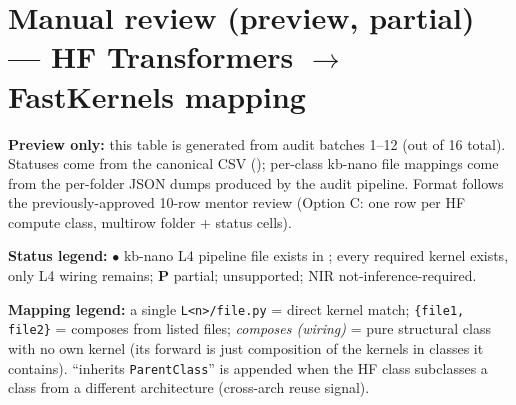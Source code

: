\documentclass[10pt]{article}
\newcommand{\cmark}{\ding{51}}
\newcommand{\xmark}{\ding{55}}
\newcommand{\fastkernels}{FastKernels}
\begin{document}
\section*{Manual review (preview, partial) --- HF Transformers $\to$ \fastkernels{} mapping}

\noindent
\textbf{Preview only:} this table is generated from audit batches 1--12 (out of 16 total).
Statuses come from the canonical CSV
(\texttt{}); per-class kb-nano file
mappings come from the per-folder JSON dumps produced by the audit pipeline.
Format follows the previously-approved 10-row mentor review (Option C: one row
per HF compute class, multirow folder + status cells).

\textbf{Status legend:} $\bullet$ kb-nano L4 pipeline file exists in
\texttt{}; \cmark{} every required kernel exists, only L4
wiring remains; \textbf{P} partial; \xmark{} unsupported; NIR
not-inference-required.

\textbf{Mapping legend:} a single \texttt{L<n>/file.py} = direct kernel match;
\texttt{\{file1, file2\}} = composes from listed files;
\textit{composes (wiring)} = pure structural class with no own kernel
(its forward is just composition of the kernels in classes it contains).
``inherits \texttt{ParentClass}'' is appended when the HF class subclasses a
class from a different architecture (cross-arch reuse signal).
\end{document}
